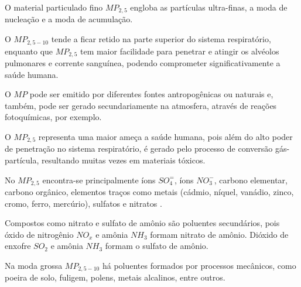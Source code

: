 O material particulado fino $MP_{2,5}$ engloba as partículas 
ultra-finas, a moda de nucleação e a moda de acumulação.  

O $MP_{2,5-10}$ tende a ficar retido na parte superior do sistema respiratório, 
enquanto que $MP_{2,5}$ tem maior facilidade para penetrar e atingir 
os alvéolos pulmonares e corrente sanguínea, 
podendo comprometer significativamente a saúde humana. 

O $MP$ pode ser emitido por diferentes fontes antropogênicas ou naturais e, 
também, pode ser gerado secundariamente na atmosfera, através de 
reações fotoquímicas, por exemplo. 

O $MP_{2,5}$ representa uma maior ameça a saúde humana, pois além 
do alto poder de penetração no sistema respiratório,
é gerado pelo processo de conversão gás-partícula, resultando muitas
vezes em materiais tóxicos.

No $MP_{2,5}$ encontra-se principalmente íons $SO_4^=$, 
íons $ NO_3^-$, carbono elementar, carbono orgânico, 
elementos traços como metais 
(cádmio, níquel, vanádio, zinco, cromo, ferro, mercúrio), 
sulfatos e nitratos \citep{finlayson1999}. 

Compostos como nitrato e sulfato de amônio são poluentes secundários,
pois óxido de nitrogênio $NO_x$ e amônia $NH_3$ formam nitrato de amônio. 
Dióxido de enxofre $SO_2$ e amônia $NH_3$ formam o sulfato de amônio. 

Na moda grossa $MP_{2,5-10}$ há poluentes formados por processos mecânicos, 
como poeira de solo, fuligem, polens, metais alcalinos, entre outros.%



